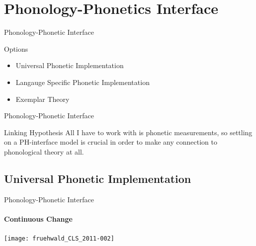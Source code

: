 \documentclass[]{beamer}
\begin{document}


\section{Phonology-Phonetics Interface}

\begin{frame}{Phonology-Phonetic Interface}

	\begin{block}{Options}
		\begin{itemize}
			\item Universal Phonetic Implementation
			\item Langauge Specific Phonetic Implementation
			\item Exemplar Theory
		\end{itemize}
	\end{block}

\end{frame}

\begin{frame}{Phonology-Phonetic Interface}
	
	\begin{block}{Linking Hypothesis}
		All I have to work with is phonetic measurements, so settling on a PH-interface model
		is crucial in order to make any connection to phonological theory at all.
	\end{block}

\end{frame}

\subsection{Universal Phonetic Implementation}




\begin{frame}{Phonology-Phonetic Interface}
	\framesubtitle{Continuous Change}

\texttt{[image: fruehwald\_CLS\_2011-002]}
	
	
\end{frame}
\end{document}
